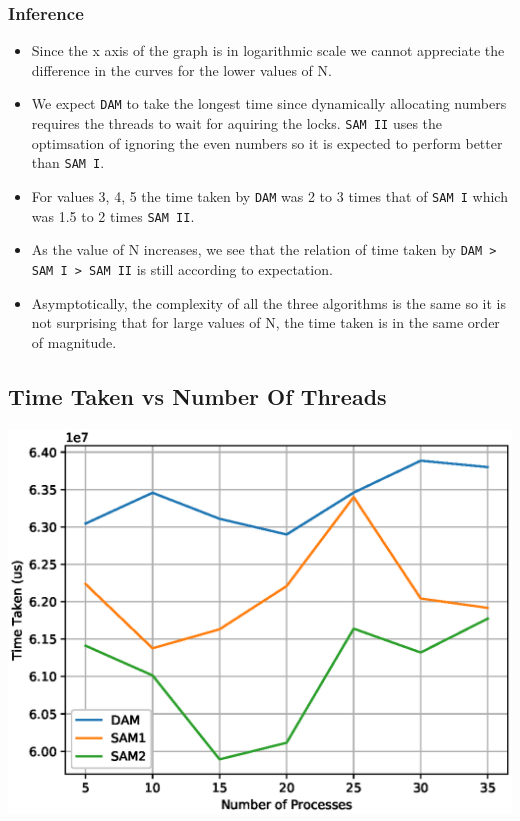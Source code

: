\documentclass[a4paper,12pt]{report}
\begin{document}
\subsubsection{Inference}
\begin{itemize}
\item Since the x axis of the graph is in logarithmic scale we cannot appreciate the difference in the curves for the lower values of N.
\item We expect \texttt{DAM} to take the longest time since dynamically allocating numbers requires the threads to wait for aquiring the locks. \texttt{SAM II} uses the optimsation of ignoring the even numbers so it is expected to perform better than \texttt{SAM I}. 
\item For values 3, 4, 5 the time taken by \texttt{DAM} was 2 to 3 times that of \texttt{SAM I} which was 1.5 to 2 times \texttt{SAM II}.
\item As the value of N increases, we see that the relation of time taken by \texttt{DAM > SAM I > SAM II} is still according to expectation.
\item Asymptotically, the complexity of all the three algorithms is the same so it is not surprising that for large values of N, the time taken is in the same order of magnitude.
\end{itemize}
\newpage
\subsection{Time Taken vs Number Of Threads}
\begin{center}
\begin{large}
\end{large}
\includegraphics[scale=0.7]{./constantN.eps}
\end{center}
\end{document}
